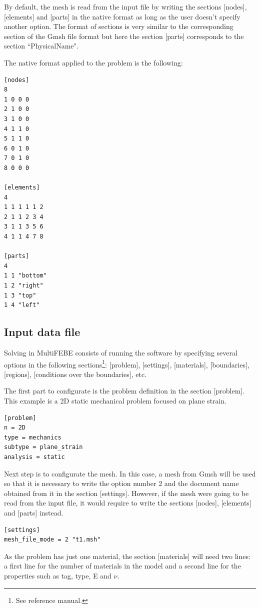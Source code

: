 \documentclass[A4]{article}
\begin{document}
By default, the mesh is read from the input file by writing the sections [nodes], [elements] and [parts] in the native format as long as the user doesn't specify another option. The format of sections is very similar to the corresponding section of the Gmsh file format but here the section [parts] corresponds to the section ``PhysicalName".

The native format applied to the problem is the following:

\begin{Verbatim}
[nodes]
8
1 0 0 0
2 1 0 0
3 1 0 0
4 1 1 0
5 1 1 0
6 0 1 0
7 0 1 0
8 0 0 0

[elements]
4
1 1 1 1 1 2
2 1 1 2 3 4
3 1 1 3 5 6
4 1 1 4 7 8

[parts]
4
1 1 "bottom"
1 2 "right"
1 3 "top"
1 4 "left"
\end{Verbatim}

\subsection{Input data file}

Solving in MultiFEBE consists of running the software by specifying several options in the following sections\footnote{See reference manual.}: [problem], [settings], [materials], [boundaries], [regions], [conditions over the boundaries], etc.

The first part to configurate is the problem definition in the section [problem]. This example is a 2D static mechanical problem focused on plane strain.  

\begin{Verbatim}	
[problem]
n = 2D
type = mechanics
subtype = plane_strain
analysis = static
\end{Verbatim}

Next step is to configurate the mesh. In this case, a mesh from Gmsh will be used so that it is necessary to write the option number 2 and the document name obtained from it in the section [settings]. However, if the mesh were going to be read from the input file, it would require to write the sections [nodes], [elements] and [parts] instead.

\begin{Verbatim}	
[settings]
mesh_file_mode = 2 "t1.msh"
\end{Verbatim}

As the problem has just one material, the section [materials] will need two lines: a first line for the number of materials in the model and a second line for the properties such as tag, type, E and $\nu$.
\end{document}
